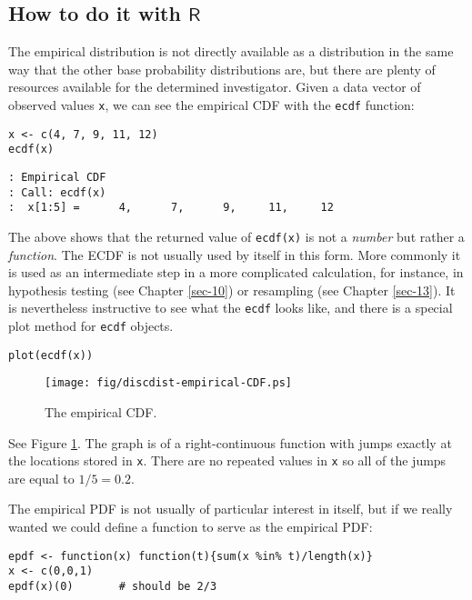 \subsection{How to do it with \(\mathsf{R}\)}
\label{sec-5-5-1}

The empirical distribution is not directly available as a distribution
in the same way that the other base probability distributions are, but
there are plenty of resources available for the determined
investigator.  Given a data vector of observed values \texttt{x}, we can see
the empirical CDF with the \texttt{ecdf}  function:

\begin{verbatim}
x <- c(4, 7, 9, 11, 12)
ecdf(x)
\end{verbatim}

\begin{verbatim}
: Empirical CDF 
: Call: ecdf(x)
:  x[1:5] =      4,      7,      9,     11,     12
\end{verbatim}

The above shows that the returned value of \texttt{ecdf(x)} is not a \emph{number}
but rather a \emph{function}. The ECDF is not usually used by itself in
this form. More commonly it is used as an intermediate step in a more
complicated calculation, for instance, in hypothesis testing (see
Chapter \ref{sec-10}) or resampling (see Chapter
\ref{sec-13}). It is nevertheless instructive to see
what the \texttt{ecdf} looks like, and there is a special plot method for
\texttt{ecdf} objects.

\begin{verbatim}
plot(ecdf(x))
\end{verbatim}

\begin{figure}[ht!]
\centering
\texttt{[image: fig/discdist-empirical-CDF.ps]}
\caption[The empirical CDF]{\label{fig-empirical-CDF}\small The empirical CDF.}
\end{figure}

See Figure \ref{fig-empirical-CDF}. The graph is of a right-continuous function
with jumps exactly at the locations stored in \texttt{x}. There are no
repeated values in \texttt{x} so all of the jumps are equal to \(1/5=0.2\).

The empirical PDF is not usually of particular interest in itself, but
if we really wanted we could define a function to serve as the
empirical PDF:

\begin{verbatim}
epdf <- function(x) function(t){sum(x %in% t)/length(x)}
x <- c(0,0,1)
epdf(x)(0)       # should be 2/3
\end{verbatim}


